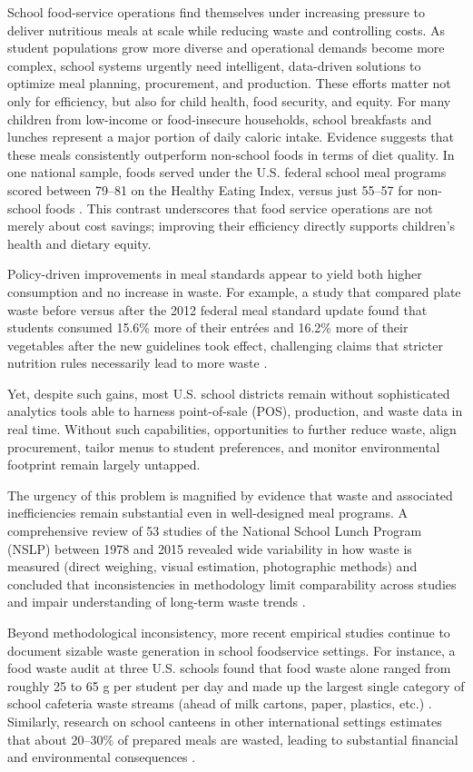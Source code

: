 \documentclass[journal]{IEEEtran}
\begin{document}
School food-service operations find themselves under increasing pressure to deliver nutritious meals at scale while reducing waste and controlling costs. As student populations grow more diverse and operational demands become more complex, school systems urgently need intelligent, data-driven solutions to optimize meal planning, procurement, and production. These efforts matter not only for efficiency, but also for child health, food security, and equity. For many children from low-income or food-insecure households, school breakfasts and lunches represent a major portion of daily caloric intake. Evidence suggests that these meals consistently outperform non-school foods in terms of diet quality. In one national sample, foods served under the U.S. federal school meal programs scored between 79–81 on the Healthy Eating Index, versus just 55–57 for non-school foods \cite{guthrie}. This contrast underscores that food service operations are not merely about cost savings; improving their efficiency directly supports children’s health and dietary equity.

Policy-driven improvements in meal standards appear to yield both higher consumption and no increase in waste. For example, a study that compared plate waste before versus after the 2012 federal meal standard update found that students consumed 15.6\% more of their entrées and 16.2\% more of their vegetables after the new guidelines took effect, challenging claims that stricter nutrition rules necessarily lead to more waste \cite{cohen}.

Yet, despite such gains, most U.S. school districts remain without sophisticated analytics tools able to harness point-of-sale (POS), production, and waste data in real time. Without such capabilities, opportunities to further reduce waste, align procurement, tailor menus to student preferences, and monitor environmental footprint remain largely untapped. 

The urgency of this problem is magnified by evidence that waste and associated inefficiencies remain substantial even in well-designed meal programs. A comprehensive review of 53 studies of the National School Lunch Program (NSLP) between 1978 and 2015 revealed wide variability in how waste is measured (direct weighing, visual estimation, photographic methods) and concluded that inconsistencies in methodology limit comparability across studies and impair understanding of long-term waste trends \cite{byker}.

Beyond methodological inconsistency, more recent empirical studies continue to document sizable waste generation in school foodservice settings. For instance, a food waste audit at three U.S. schools found that food waste alone ranged from roughly 25 to 65 g per student per day and made up the largest single category of school cafeteria waste streams (ahead of milk cartons, paper, plastics, etc.) \cite{wilkie}. Similarly, research on school canteens in other international settings estimates that about 20–30\% of prepared meals are wasted, leading to substantial financial and environmental consequences \cite{chu}.
\end{document}
